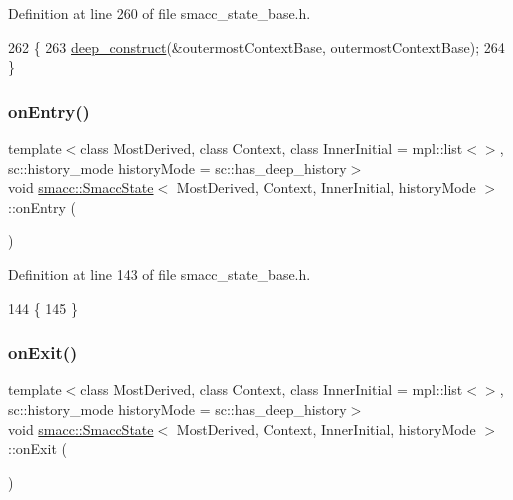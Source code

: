 Definition at line 260 of file smacc\+\_\+state\+\_\+base.\+h.


\begin{DoxyCode}
262   \{
263     \hyperlink{classsmacc_1_1SmaccState_aac23d8a6909f75c5e5fca2a7c09b5368}{deep\_construct}(&outermostContextBase, outermostContextBase);
264   \}
\end{DoxyCode}
\mbox{\label{classsmacc_1_1SmaccState_a4a10a74fdbe51a798b8d651668b8ed9a}} 
\subsubsection{\texorpdfstring{on\+Entry()}{onEntry()}}
{\footnotesize\ttfamily template$<$class Most\+Derived, class Context, class Inner\+Initial = mpl\+::list$<$$>$, sc\+::history\+\_\+mode history\+Mode = sc\+::has\+\_\+deep\+\_\+history$>$ \\
void \hyperlink{classsmacc_1_1SmaccState}{smacc\+::\+Smacc\+State}$<$ Most\+Derived, Context, Inner\+Initial, history\+Mode $>$\+::on\+Entry (\begin{DoxyParamCaption}{ }\end{DoxyParamCaption})\hspace{0.3cm}{\ttfamily [inline]}}



Definition at line 143 of file smacc\+\_\+state\+\_\+base.\+h.


\begin{DoxyCode}
144   \{
145   \}
\end{DoxyCode}
\mbox{\label{classsmacc_1_1SmaccState_a82ca7c69153e86dc5eedf3f909560f3a}} 
\subsubsection{\texorpdfstring{on\+Exit()}{onExit()}}
{\footnotesize\ttfamily template$<$class Most\+Derived, class Context, class Inner\+Initial = mpl\+::list$<$$>$, sc\+::history\+\_\+mode history\+Mode = sc\+::has\+\_\+deep\+\_\+history$>$ \\
void \hyperlink{classsmacc_1_1SmaccState}{smacc\+::\+Smacc\+State}$<$ Most\+Derived, Context, Inner\+Initial, history\+Mode $>$\+::on\+Exit (\begin{DoxyParamCaption}{ }\end{DoxyParamCaption})\hspace{0.3cm}{\ttfamily [inline]}}




